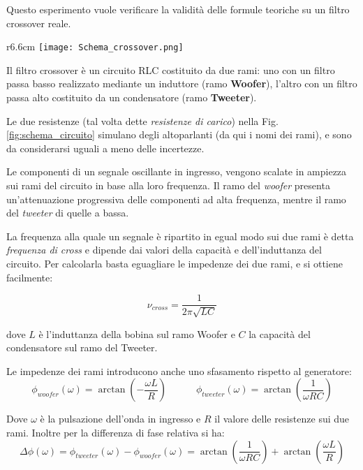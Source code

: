 \documentclass[../Relazione_circuiti]{subfiles}
\begin{document}
Questo esperimento vuole verificare la validità delle formule teoriche su un filtro crossover reale.

\begin{wrapfigure}{r}{6.6cm}
  \centering
  \texttt{[image: Schema\_crossover.png]}
  \caption{Schema del circuito realizzato}
  \label{fig:schema_circuito}
\end{wrapfigure}

Il filtro crossover è un circuito RLC costituito da due rami: uno con un filtro passa basso realizzato mediante un
induttore (ramo \textbf{Woofer}), l'altro con un filtro passa alto costituito da un condensatore (ramo
\textbf{Tweeter}).

Le due resistenze (tal volta dette \textit{resistenze di carico}) nella Fig.\,\ref{fig:schema_circuito} simulano degli
altoparlanti (da qui i nomi dei rami), e sono da considerarsi uguali a meno delle incertezze.

Le componenti di un segnale oscillante in ingresso, vengono scalate in ampiezza sui rami del circuito in base alla loro
frequenza.
Il ramo del \textit{woofer} presenta un'attenuazione progressiva delle componenti ad alta frequenza, mentre il ramo
del \textit{tweeter} di quelle a bassa.

La frequenza alla quale un segnale è ripartito in egual modo sui due rami è detta \textit{frequenza di cross} e dipende
dai valori della capacità e dell'induttanza del circuito.
Per calcolarla basta eguagliare le impedenze dei due rami, e si ottiene facilmente:

\begin{equation}
  \label{eq:f_cross}
  \nu_{cross} = \frac{1}{2 \pi \sqrt{LC} }
\end{equation}

dove $L$ è l'induttanza della bobina sul ramo Woofer e $C$ la capacità del condensatore sul ramo del Tweeter.

Le impedenze dei rami introducono anche uno sfasamento rispetto al generatore:
\begin{equation}
\label{eq: p_w_t}
  \phi_{woofer}(\omega) = \arctan(-\frac{\omega L}{R}) \qquad \quad %
  \phi_{tweeter}(\omega) = \arctan(\frac{1}{\omega RC}) %
\end{equation}

Dove $\omega$ è la pulsazione dell'onda in ingresso e $R$ il valore delle resistenze sui due rami.
Inoltre per la differenza di fase relativa si ha:
\begin{equation}
  \label{eq:p_diff}
  \Delta \phi(\omega) = \phi_{tweeter}(\omega) - \phi_{woofer}(\omega) = \arctan(\frac{1}{\omega RC}) + \arctan(\frac{\omega L}{R})
\end{equation}
\end{document}
